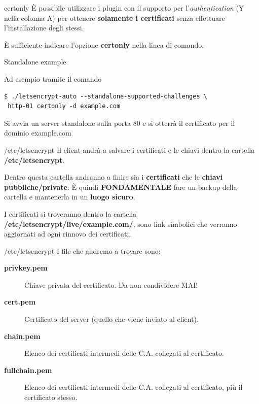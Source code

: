 \documentclass[xcolor=svgnames,11pt]{beamer}
\begin{document}
\begin{frame}[fragile]{certonly}
È possibile utilizzare i plugin con il supporto per l'\emph{authentication} (Y nella colonna A)
per ottenere \textbf{solamente i certificati} senza effettuare l'installazione degli stessi.

\medskip\pause

È sufficiente indicare l'opzione \textbf{certonly} nella linea di comando.

\medskip

\begin{block}{Standalone example}

Ad esempio tramite il comando
\begin{scriptsize}
\begin{verbatim}
$ ./letsencrypt-auto --standalone-supported-challenges \
 http-01 certonly -d example.com
\end{verbatim}
\end{scriptsize}

Si avvia un server standalone sulla porta 80 e si otterrà il certificato per il dominio example.com
\end{block}
\end{frame}

\begin{frame}{/etc/letsencrypt}
Il client andrà a salvare i certificati e le chiavi dentro la cartella \textbf{/etc/letsencrypt}.

\medskip\pause
{
\begin{block}{}
Dentro questa cartella andranno a finire sia i \textbf{certificati} che le \textbf{chiavi pubbliche/private}.
È quindi \textbf{FONDAMENTALE} fare un backup della cartella e mantenerla in un \textbf{luogo sicuro}.
\end{block}
}
I certificati si troveranno dentro la cartella \textbf{/etc/letsencrypt/live/example.com/}, sono link
simbolici che verranno aggiornati ad ogni rinnovo dei certificati.
\end{frame}

\begin{frame}{/etc/letsencrypt}
I file che andremo a trovare sono:
\begin{description}
  \item[\textbf{privkey.pem}] Chiave privata del certificato. Da non condividere MAI!
  \item[\textbf{cert.pem}] Certificato del server (quello che viene inviato al client).
  \item[\textbf{chain.pem}] Elenco dei certificati intermedi delle C.A. collegati al certificato.
  \item[\textbf{fullchain.pem}] Elenco dei certificati intermedi delle C.A. collegati al certificato, più il certificato stesso.
\end{description}
\end{frame}
\end{document}
